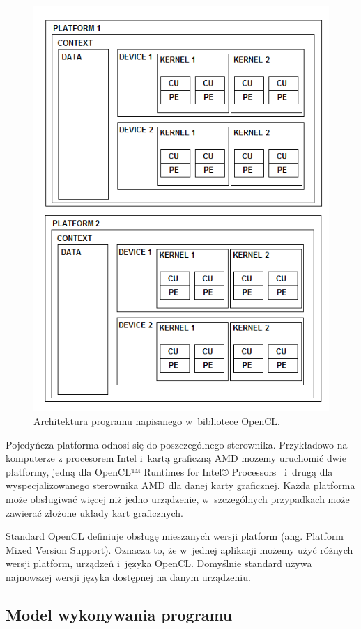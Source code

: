 \begin{figure}[h]
        \centering
                \centering
                \includegraphics[width=12cm]{rys8}
	\caption{Architektura programu napisanego w~bibliotece OpenCL.}
\end{figure}

Pojedyńcza platforma odnosi się do poszczególnego sterownika. Przykładowo na komputerze z procesorem Intel i~kartą graficzną AMD mozemy uruchomić dwie platformy, jedną dla OpenCL™ Runtimes for Intel® Processors~\cite{b22} i~drugą dla wyspecjalizowanego sterownika AMD dla danej karty graficznej. Każda platforma może obsługiwać więcej niż jedno urządzenie, w~szczególnych przypadkach może zawierać złożone układy kart graficznych. 

Standard OpenCL definiuje obsługę mieszanych wersji platform (ang. Platform Mixed Version Support). Oznacza to, że w~jednej aplikacji możemy użyć różnych wersji platform, urządzeń i~języka OpenCL. Domyślnie standard używa najnowszej wersji języka dostępnej na danym urządzeniu.

\subsection{Model wykonywania programu}\label{sec:mwp}

